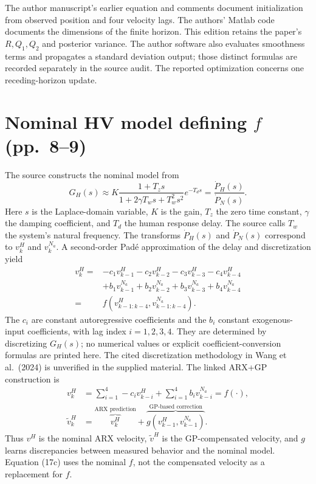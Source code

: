 \documentclass{article}
\begin{document}
The author manuscript's earlier equation and comments document initialization from observed position and four velocity lags. The authors' Matlab code documents the dimensions of the finite horizon. This edition retains the paper's $R,Q_1,Q_2$ and posterior variance. The author software also evaluates smoothness terms and propagates a standard deviation output; those distinct formulas are recorded separately in the source audit. The reported optimization concerns one receding-horizon update.

\section*{Nominal HV model defining \texorpdfstring{$f$}{f} (pp.\ 8--9)}
The source constructs the nominal model from
\begin{equation}
G_H(s)\approx K\frac{1+T_zs}{1+2\gamma T_ws+T_w^2s^2}e^{-T_ds}
 =\frac{\dot P_H(s)}{\dot P_N(s)}.\tag{1}
\end{equation}
Here $s$ is the Laplace-domain variable, $K$ is the gain, $T_z$ the zero time constant, $\gamma$ the damping coefficient, and $T_d$ the human response delay. The source calls $T_w$ the system's natural frequency. The transforms $\dot P_H(s)$ and $\dot P_N(s)$ correspond to $v_k^H$ and $v_k^{N_a}$. A second-order Pad\'e approximation of the delay and discretization yield
\begin{equation}
\begin{aligned}
v_k^H={}&-c_1v_{k-1}^H-c_2v_{k-2}^H-c_3v_{k-3}^H-c_4v_{k-4}^H\\
&+b_1v_{k-1}^{N_a}+b_2v_{k-2}^{N_a}+b_3v_{k-3}^{N_a}+b_4v_{k-4}^{N_a}\\
={}&f\left(v_{k-1:k-4}^H,v_{k-1:k-4}^{N_a}\right).
\end{aligned}\tag{2}
\end{equation}
The $c_i$ are constant autoregressive coefficients and the $b_i$ constant exogenous-input coefficients, with lag index $i=1,2,3,4$. They are determined by discretizing $G_H(s)$; no numerical values or explicit coefficient-conversion formulas are printed here. The cited discretization methodology in Wang et al.\ (2024) is unverified in the supplied material. The linked ARX+GP construction is
\begin{align}
v_k^H&=\sum_{i=1}^{4}-c_i v_{k-i}^H
       +\sum_{i=1}^{4}b_i v_{k-i}^{N_a}=f(\cdot),\tag{3a}\\
\widetilde v_k^H&=\overbrace{v_k^H}^{\text{ARX prediction}}
 +\overbrace{g(v_{k-1}^H,v_{k-1}^{N_a})}^{\text{GP-based correction}}.\tag{3b}
\end{align}
Thus $v^H$ is the nominal ARX velocity, $\widetilde v^H$ is the GP-compensated velocity, and $g$ learns discrepancies between measured behavior and the nominal model. Equation (17c) uses the nominal $f$, not the compensated velocity as a replacement for $f$.
\end{document}
